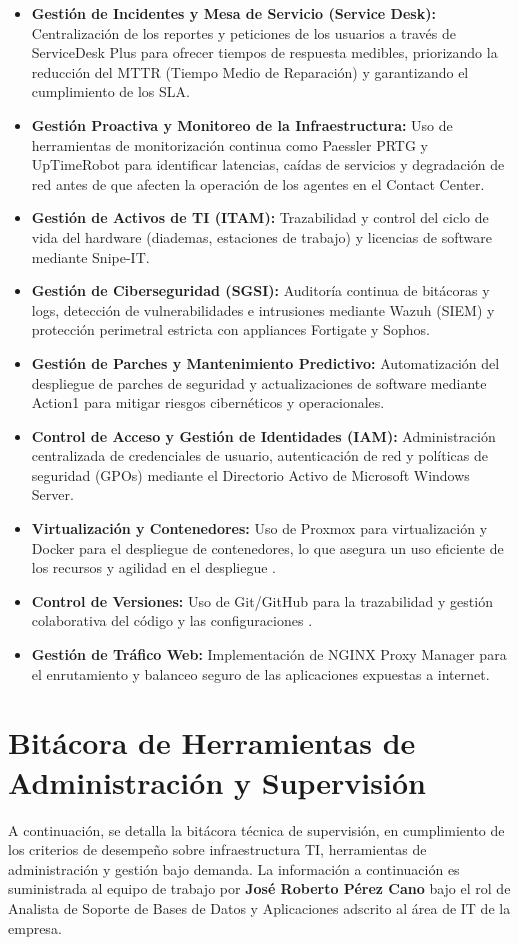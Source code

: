 	\begin{itemize}
		\item \textbf{Gestión de Incidentes y Mesa de Servicio (Service Desk):} Centralización de los reportes y peticiones de los usuarios a través de ServiceDesk Plus para ofrecer tiempos de respuesta medibles, priorizando la reducción del MTTR (Tiempo Medio de Reparación) y garantizando el cumplimiento de los SLA.
		\item \textbf{Gestión Proactiva y Monitoreo de la Infraestructura:} Uso de herramientas de monitorización continua como Paessler PRTG y UpTimeRobot para identificar latencias, caídas de servicios y degradación de red antes de que afecten la operación de los agentes en el Contact Center.
		\item \textbf{Gestión de Activos de TI (ITAM):} Trazabilidad y control del ciclo de vida del hardware (diademas, estaciones de trabajo) y licencias de software mediante Snipe-IT.
		\item \textbf{Gestión de Ciberseguridad (SGSI):} Auditoría continua de bitácoras y logs, detección de vulnerabilidades e intrusiones mediante Wazuh (SIEM) y protección perimetral estricta con appliances Fortigate y Sophos.
		\item \textbf{Gestión de Parches y Mantenimiento Predictivo:} Automatización del despliegue de parches de seguridad y actualizaciones de software mediante Action1 para mitigar riesgos cibernéticos y operacionales.
		\item \textbf{Control de Acceso y Gestión de Identidades (IAM):} Administración centralizada de credenciales de usuario, autenticación de red y políticas de seguridad (GPOs) mediante el Directorio Activo de Microsoft Windows Server.
		\item \textbf{Virtualización y Contenedores:} Uso de Proxmox para virtualización y Docker para el despliegue de contenedores, lo que asegura un uso eficiente de los recursos y agilidad en el despliegue \parencite{sena2026redes}.
		\item \textbf{Control de Versiones:} Uso de Git/GitHub para la trazabilidad y gestión colaborativa del código y las configuraciones \parencite{sena2026redes}.
		\item \textbf{Gestión de Tráfico Web:} Implementación de NGINX Proxy Manager para el enrutamiento y balanceo seguro de las aplicaciones expuestas a internet.
		\end{itemize}
	
	\section{Bitácora de Herramientas de Administración y Supervisión}
	A continuación, se detalla la bitácora técnica de supervisión, en cumplimiento de los criterios de desempeño sobre infraestructura TI, herramientas de administración y gestión bajo demanda. La información a continuación es suministrada al equipo de trabajo por \textbf{José Roberto Pérez Cano} bajo el rol de Analista de Soporte de Bases de Datos y Aplicaciones adscrito al área de IT de la empresa.
	
